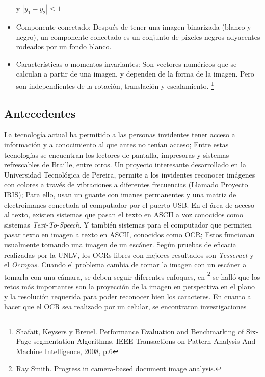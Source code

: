 \documentclass[a4paper, 11pt, oneside]{article}
\begin{document}
\begin{itemize}
    y $|y_1-y_2| \le 1$
    \item Componente conectado: Después de tener una imagen binarizada (blanco y negro), un
    componente conectado es un conjunto de píxeles negros adyacentes rodeados por un fondo blanco.
    \item Características o momentos invariantes: Son vectores numéricos que se calculan a partir
    de una imagen, y dependen de la forma de la imagen. Pero son independientes de la rotación,
    translación y escalamiento.
    \footnote{Shafait, Keysers y Breuel. Performance Evaluation and Benchmarking of Six-Page segmentation
    Algorithms, IEEE Transactions on Pattern Analysis And Machine Intelligence, 2008, p.6}
   
	\end{itemize}
	
	\subsection {Antecedentes}
	La tecnología actual ha permitido a las personas invidentes tener acceso a información
	y a conocimiento al que antes no tenían acceso; Entre estas tecnologías se encuentran los
	lectores de pantalla, impresoras y sistemas refrescables de Braille, entre otros.
	Un proyecto interesante desarrollado en la Universidad Tecnológica de Pereira, permite
	a los invidentes reconocer imágenes con colores a través de vibraciones a diferentes
	frecuencias (Llamado Proyecto IRIS); Para ello, usan un guante con imanes 
	permanentes y una matriz de electroimanes conectada al computador por el puerto USB.
	\newline \newline
	En el área de acceso al texto, existen sistemas que pasan el texto en ASCII a voz
	conocidos como sistemas \textit{Text-To-Speech}. Y también sistemas para el computador
	que permiten pasar texto en imagen a texto en ASCII, conocidos como OCR; Estos funcionan
	usualmente tomando una imagen de un escáner. Según pruebas de eficacia realizadas por
	la UNLV, los OCRs libres con mejores resultados son	\textit{Tesseract} y el 
	\textit{Ocropus}. Cuando el problema cambia de tomar la imagen con un escáner a tomarla
	con una cámara, se deben seguir diferentes enfoques, en 
	\footnote{Ray Smith. Progress in camera-based document image analysis.} se halló que los
	retos más importantes son la proyección de la imagen en perspectiva en el plano y la 
	resolución requerida para poder reconocer bien los caracteres.
	En cuanto a hacer que el OCR sea realizado por un celular, se encontraron investigaciones
\end{document}
